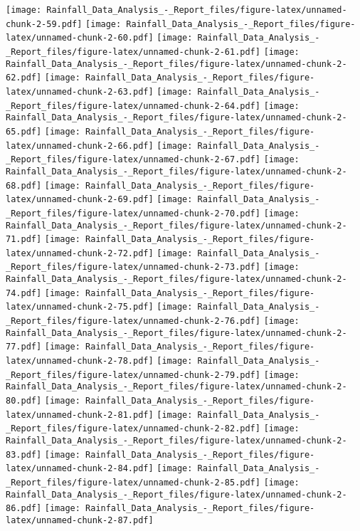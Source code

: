 \documentclass[
]{article}
\begin{document}
\texttt{[image: Rainfall\_Data\_Analysis\_-\_Report\_files/figure-latex/unnamed-chunk-2-59.pdf]}
\texttt{[image: Rainfall\_Data\_Analysis\_-\_Report\_files/figure-latex/unnamed-chunk-2-60.pdf]}
\texttt{[image: Rainfall\_Data\_Analysis\_-\_Report\_files/figure-latex/unnamed-chunk-2-61.pdf]}
\texttt{[image: Rainfall\_Data\_Analysis\_-\_Report\_files/figure-latex/unnamed-chunk-2-62.pdf]}
\texttt{[image: Rainfall\_Data\_Analysis\_-\_Report\_files/figure-latex/unnamed-chunk-2-63.pdf]}
\texttt{[image: Rainfall\_Data\_Analysis\_-\_Report\_files/figure-latex/unnamed-chunk-2-64.pdf]}
\texttt{[image: Rainfall\_Data\_Analysis\_-\_Report\_files/figure-latex/unnamed-chunk-2-65.pdf]}
\texttt{[image: Rainfall\_Data\_Analysis\_-\_Report\_files/figure-latex/unnamed-chunk-2-66.pdf]}
\texttt{[image: Rainfall\_Data\_Analysis\_-\_Report\_files/figure-latex/unnamed-chunk-2-67.pdf]}
\texttt{[image: Rainfall\_Data\_Analysis\_-\_Report\_files/figure-latex/unnamed-chunk-2-68.pdf]}
\texttt{[image: Rainfall\_Data\_Analysis\_-\_Report\_files/figure-latex/unnamed-chunk-2-69.pdf]}
\texttt{[image: Rainfall\_Data\_Analysis\_-\_Report\_files/figure-latex/unnamed-chunk-2-70.pdf]}
\texttt{[image: Rainfall\_Data\_Analysis\_-\_Report\_files/figure-latex/unnamed-chunk-2-71.pdf]}
\texttt{[image: Rainfall\_Data\_Analysis\_-\_Report\_files/figure-latex/unnamed-chunk-2-72.pdf]}
\texttt{[image: Rainfall\_Data\_Analysis\_-\_Report\_files/figure-latex/unnamed-chunk-2-73.pdf]}
\texttt{[image: Rainfall\_Data\_Analysis\_-\_Report\_files/figure-latex/unnamed-chunk-2-74.pdf]}
\texttt{[image: Rainfall\_Data\_Analysis\_-\_Report\_files/figure-latex/unnamed-chunk-2-75.pdf]}
\texttt{[image: Rainfall\_Data\_Analysis\_-\_Report\_files/figure-latex/unnamed-chunk-2-76.pdf]}
\texttt{[image: Rainfall\_Data\_Analysis\_-\_Report\_files/figure-latex/unnamed-chunk-2-77.pdf]}
\texttt{[image: Rainfall\_Data\_Analysis\_-\_Report\_files/figure-latex/unnamed-chunk-2-78.pdf]}
\texttt{[image: Rainfall\_Data\_Analysis\_-\_Report\_files/figure-latex/unnamed-chunk-2-79.pdf]}
\texttt{[image: Rainfall\_Data\_Analysis\_-\_Report\_files/figure-latex/unnamed-chunk-2-80.pdf]}
\texttt{[image: Rainfall\_Data\_Analysis\_-\_Report\_files/figure-latex/unnamed-chunk-2-81.pdf]}
\texttt{[image: Rainfall\_Data\_Analysis\_-\_Report\_files/figure-latex/unnamed-chunk-2-82.pdf]}
\texttt{[image: Rainfall\_Data\_Analysis\_-\_Report\_files/figure-latex/unnamed-chunk-2-83.pdf]}
\texttt{[image: Rainfall\_Data\_Analysis\_-\_Report\_files/figure-latex/unnamed-chunk-2-84.pdf]}
\texttt{[image: Rainfall\_Data\_Analysis\_-\_Report\_files/figure-latex/unnamed-chunk-2-85.pdf]}
\texttt{[image: Rainfall\_Data\_Analysis\_-\_Report\_files/figure-latex/unnamed-chunk-2-86.pdf]}
\texttt{[image: Rainfall\_Data\_Analysis\_-\_Report\_files/figure-latex/unnamed-chunk-2-87.pdf]}
\end{document}
